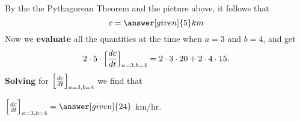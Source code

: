 \documentclass{ximera}
\begin{document}
\begin{example}
\begin{explanation}
\begin{image}
\end{image}
By the the Pythagorean Theorem and the picture above, it follows that
\[
c = \answer[given]{5}  km
\]
Now we  \textbf{evaluate} all the quantities at the time when $a=3$ and $b=4$, and get 
\[
2\cdot 5 \cdot \Bigl[\frac{dc}{dt}\Bigr]_{a=3, b=4} = 2 \cdot 3\cdot 20 + 2 \cdot 4 \cdot 15.
\]
\textbf{Solving} for $\Bigl[\frac{dc}{dt}\Bigr]_{a=3, b=4}$ we find that

 $\Bigl[\frac{dc}{dt}\Bigr]_{a=3, b=4} = \answer[given]{24}$ km/hr.\\
\end{explanation}
\end{example}
\end{document}
